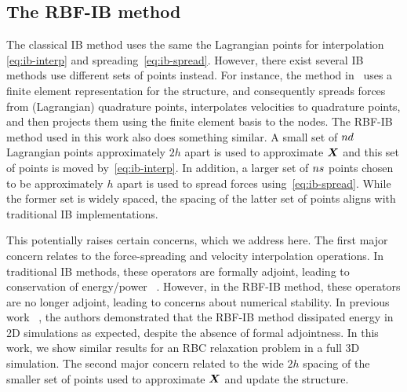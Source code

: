 \subsection{The RBF-IB method}\label{sec:rbfib}
The classical IB method uses the same the Lagrangian points for interpolation~%
\eqref{eq:ib-interp} and spreading~\eqref{eq:ib-spread}. However, there exist several IB
methods use different sets of points instead. For instance, the method in~%
\cite{Griffith:2017id} uses a finite element representation for the structure, and
consequently spreads forces from (Lagrangian) quadrature points, interpolates velocities
to quadrature points, and then projects them using the finite element basis to the nodes.
The RBF-IB method used in this work also does something similar. A small set of
$\data\cardinality$ Lagrangian points approximately $2h$ apart is used to approximate
$\boldsymbol{X}$ and this set of points is moved by~\eqref{eq:ib-interp}. In addition, a larger set
of $\sample\cardinality$ points chosen to be approximately $h$ apart is used to spread
forces using~\eqref{eq:ib-spread}. While the former set is widely spaced, the spacing of
the latter set of points aligns with traditional IB implementations.

This potentially raises certain concerns, which we address here. The first major concern
relates to the force-spreading and velocity interpolation operations. In traditional IB
methods, these operators are formally adjoint, leading to conservation of energy/power~%
\cite{Peskin:2002go}. However, in the RBF-IB method, these operators are no longer
adjoint, leading to concerns about numerical stability. In previous work~%
\cite{Shankar2015:km}, the authors demonstrated that the RBF-IB method dissipated energy
in 2D simulations as expected, despite the absence of formal adjointness. In this work,
we show similar results for an RBC relaxation problem in a full 3D simulation. The second
major concern related to the wide $2h$ spacing of the smaller set of points used to
approximate $\boldsymbol{X}$ and update the structure. 
